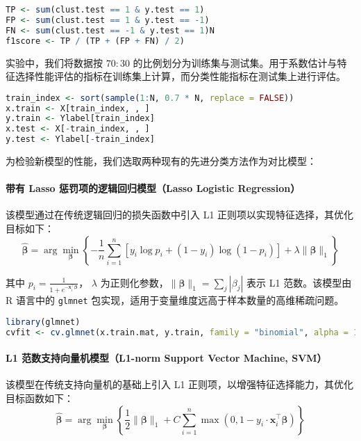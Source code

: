 \documentclass[AutoFakeBold]{LZUThesis}
\begin{document}
\begin{lstlisting}[language=R]
TP <- sum(clust.test == 1 & y.test == 1)
FP <- sum(clust.test == 1 & y.test == -1)
FN <- sum(clust.test == -1 & y.test == 1)N
f1score <- TP / (TP + (FP + FN) / 2)
\end{lstlisting}

实验中，我们将数据按 $70{:}30$ 的比例划分为训练集与测试集。用于系数估计与特征选择性能评估的指标在训练集上计算，而分类性能指标在测试集上进行评估。
\begin{lstlisting}[language=R]
train_index <- sort(sample(1:N, 0.7 * N, replace = FALSE))
x.train <- X[train_index, , ]
y.train <- Ylabel[train_index]
x.test <- X[-train_index, , ]
y.test <- Ylabel[-train_index]
\end{lstlisting}

为检验新模型的性能，我们选取两种现有的先进分类方法作为对比模型：

\paragraph{带有 Lasso 惩罚项的逻辑回归模型（Lasso Logistic Regression）}

该模型通过在传统逻辑回归的损失函数中引入 L1 正则项以实现特征选择，其优化目标如下：
\begin{equation}
	\hat{\boldsymbol{\beta}} = \arg\min_{\boldsymbol{\beta}} \left\{ 
	-\frac{1}{n} \sum_{i=1}^{n} \left[ y_i \log p_i + (1 - y_i) \log (1 - p_i) \right] 
	+ \lambda \|\boldsymbol{\beta}\|_1 
	\right\}
	\label{Equation:Lasso}
\end{equation}

其中 \( p_i = \frac{1}{1 + e^{-\mathbf{x}_i^\top \boldsymbol{\beta}}} \)，
\(\lambda\) 为正则化参数，\(\|\boldsymbol{\beta}\|_1 = \sum_j |\beta_j|\) 表示 L1 范数。该模型由 R 语言中的 \texttt{glmnet} 包实现，适用于变量维度远高于样本数量的高维稀疏问题。
\begin{lstlisting}[language=R]
library(glmnet)
cvfit <- cv.glmnet(x.train.mat, y.train, family = "binomial", alpha = 1)
\end{lstlisting}

\paragraph{L1 范数支持向量机模型（L1-norm Support Vector Machine, SVM）}
该模型在传统支持向量机的基础上引入 L1 正则项，以增强特征选择能力，其优化目标函数如下：
\begin{equation}
	\hat{\boldsymbol{\beta}} = \arg\min_{\boldsymbol{\beta}} \left\{ 
	\frac{1}{2} \|\boldsymbol{\beta}\|_1 + C \sum_{i=1}^{n} \max(0, 1 - y_i \cdot \mathbf{x}_i^\top \boldsymbol{\beta}) 
	\right\}
	\label{Equation:L1SVM}
\end{equation}
\end{document}
